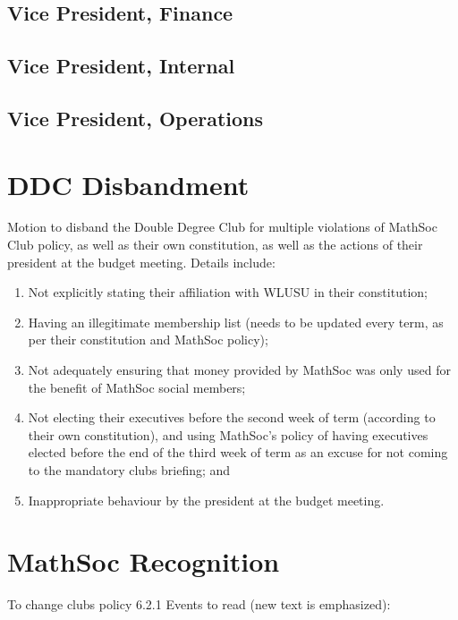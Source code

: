 \documentclass[12pt, letterpaper]{article}
\begin{document}
\subsection*{Vice President, Finance}


\subsection*{Vice President, Internal}


\subsection*{Vice President, Operations}


\newpage
{}
\section*{DDC Disbandment}
Motion to disband the Double Degree Club for multiple violations of MathSoc Club policy, as well as their own constitution, as well as the actions of their president at the budget meeting.
Details include:
\begin{enumerate}
	\item Not explicitly stating their affiliation with WLUSU in their constitution;
	\item Having an illegitimate membership list (needs to be updated every term, as per their constitution and MathSoc policy);
	\item Not adequately ensuring that money provided by MathSoc was only used for the benefit of MathSoc social members;
	\item Not electing their executives before the second week of term (according to their own constitution), and using MathSoc's policy of having executives elected before the end of the third week of term as an excuse for not coming to the mandatory clubs briefing; and
	\item Inappropriate behaviour by the president at the budget meeting.
\end{enumerate}

\newpage
{}
\section*{MathSoc Recognition}
To change clubs policy 6.2.1 Events to read (new text is emphasized):\\
\end{document}
